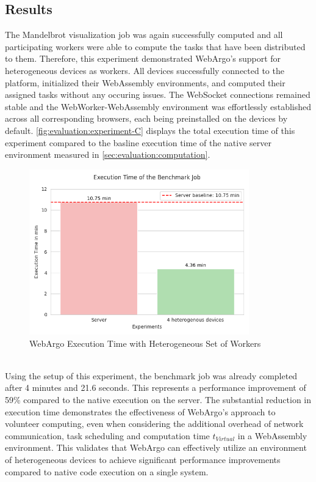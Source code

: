\subsection{Results}
The Mandelbrot visualization job was again successfully computed and all participating workers were able to compute the tasks that have been distributed to them. Therefore, this experiment demonstrated WebArgo's support for heterogeneous devices as workers. All devices successfully connected to the platform, initialized their WebAssembly environments, and computed their assigned tasks without any occuring issues. The WebSocket connections remained stable and the WebWorker-WebAssembly environment was effortlessly established across all corresponding browsers, each being preinstalled on the devices by default. \autoref{fig:evaluation:experiment-C} displays the total execution time of this experiment compared to the basline execution time of the native server environment measured in \autoref{sec:evaluation:computation}.
\begin{figure}[htbp]
    \centering
    \includegraphics[width=0.85\textwidth]{gfx/figures/Evaluation_C.png}
    \caption{WebArgo Execution Time with Heterogeneous Set of Workers}
    \label{fig:evaluation:experiment-C}
\end{figure}
~\\
Using the setup of this experiment, the benchmark job was already completed after 4 minutes and 21.6 seconds. This represents a performance improvement of 59\% compared to the native execution on the server. The substantial reduction in execution time demonstrates the effectiveness of WebArgo's approach to volunteer computing, even when considering the additional overhead of network communication, task scheduling and computation time $t_{Virtual}$ in a WebAssembly environment. This validates that WebArgo can effectively utilize an environment of heterogeneous devices to achieve significant performance improvements compared to native code execution on a  single system.
